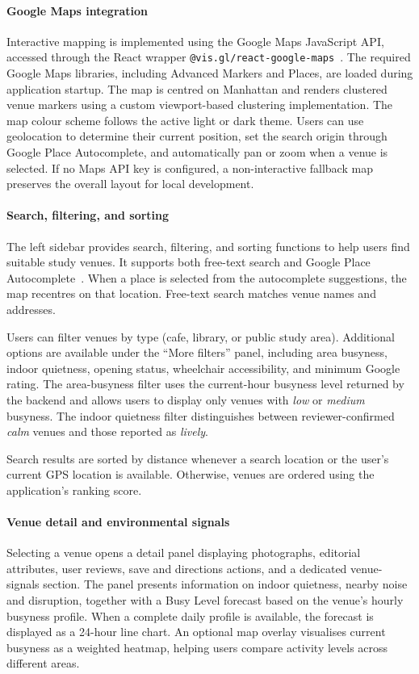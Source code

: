 \documentclass[conference]{IEEEtran}
\begin{document}
\paragraph{Google Maps integration}
Interactive mapping is implemented using the Google Maps JavaScript API, accessed through the React wrapper \texttt{@vis.gl/react-google-maps}~\cite{visglmaps}. The required Google Maps libraries, including Advanced Markers and Places, are loaded during application startup. The map is centred on Manhattan and renders clustered venue markers using a custom viewport-based clustering implementation. The map colour scheme follows the active light or dark theme. Users can use geolocation to determine their current position, set the search origin through Google Place Autocomplete, and automatically pan or zoom when a venue is selected. If no Maps API key is configured, a non-interactive fallback map preserves the overall layout for local development.

\paragraph{Search, filtering, and sorting}
The left sidebar provides search, filtering, and sorting functions to help users find suitable study venues. It supports both free-text search and Google Place Autocomplete~\cite{googleplacesautocomplete2025}. When a place is selected from the autocomplete suggestions, the map recentres on that location. Free-text search matches venue names and addresses.

Users can filter venues by type (cafe, library, or public study area). Additional options are available under the ``More filters'' panel, including area busyness, indoor quietness, opening status, wheelchair accessibility, and minimum Google rating. The area-busyness filter uses the current-hour busyness level returned by the backend and allows users to display only venues with \textit{low} or \textit{medium} busyness. The indoor quietness filter distinguishes between reviewer-confirmed \textit{calm} venues and those reported as \textit{lively}.

Search results are sorted by distance whenever a search location or the user's current GPS location is available. Otherwise, venues are ordered using the application's ranking score.

\paragraph{Venue detail and environmental signals}
Selecting a venue opens a detail panel displaying photographs, editorial attributes, user reviews, save and directions actions, and a dedicated venue-signals section. The panel presents information on indoor quietness, nearby noise and disruption, together with a Busy Level forecast based on the venue's hourly busyness profile. When a complete daily profile is available, the forecast is displayed as a 24-hour line chart. An optional map overlay visualises current busyness as a weighted heatmap, helping users compare activity levels across different areas.
\end{document}
